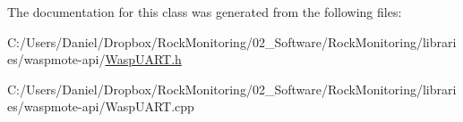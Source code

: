 The documentation for this class was generated from the following files\+:\begin{DoxyCompactItemize}
\item 
C\+:/\+Users/\+Daniel/\+Dropbox/\+Rock\+Monitoring/02\+\_\+\+Software/\+Rock\+Monitoring/libraries/waspmote-\/api/\hyperlink{_wasp_u_a_r_t_8h}{Wasp\+U\+A\+R\+T.\+h}\item 
C\+:/\+Users/\+Daniel/\+Dropbox/\+Rock\+Monitoring/02\+\_\+\+Software/\+Rock\+Monitoring/libraries/waspmote-\/api/Wasp\+U\+A\+R\+T.\+cpp\end{DoxyCompactItemize}
